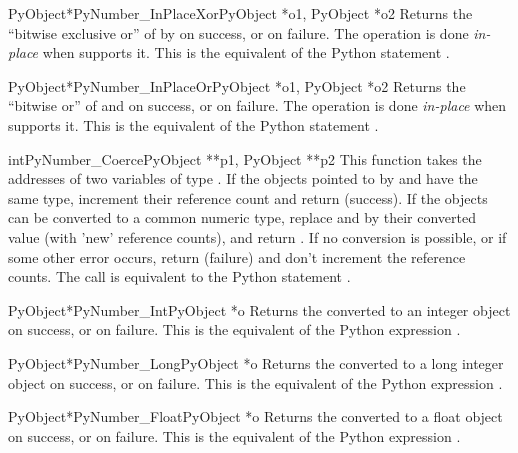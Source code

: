 \begin{cfuncdesc}{PyObject*}{PyNumber_InPlaceXor}{PyObject *o1, PyObject *o2}
  Returns the ``bitwise exclusive or'' of  by  on
  success, or \NULL{} on failure.  The operation is done
  \emph{in-place} when  supports it.  This is the equivalent
  of the Python statement .
\end{cfuncdesc}

\begin{cfuncdesc}{PyObject*}{PyNumber_InPlaceOr}{PyObject *o1, PyObject *o2}
  Returns the ``bitwise or'' of  and  on success, or
  \NULL{} on failure.  The operation is done \emph{in-place} when
   supports it.  This is the equivalent of the Python
  statement .
\end{cfuncdesc}

\begin{cfuncdesc}{int}{PyNumber_Coerce}{PyObject **p1, PyObject **p2}
  This function takes the addresses of two variables of type
  .  If the objects pointed to by 
  and  have the same type, increment their reference
  count and return  (success). If the objects can be converted
  to a common numeric type, replace  and  by their
  converted value (with 'new' reference counts), and return .
  If no conversion is possible, or if some other error occurs, return
   (failure) and don't increment the reference counts.  The
  call  is equivalent to the Python
  statement .
\end{cfuncdesc}

\begin{cfuncdesc}{PyObject*}{PyNumber_Int}{PyObject *o}
  Returns the  converted to an integer object on success, or
  \NULL{} on failure.  This is the equivalent of the Python expression
  .
\end{cfuncdesc}

\begin{cfuncdesc}{PyObject*}{PyNumber_Long}{PyObject *o}
  Returns the  converted to a long integer object on success,
  or \NULL{} on failure.  This is the equivalent of the Python
  expression .
\end{cfuncdesc}

\begin{cfuncdesc}{PyObject*}{PyNumber_Float}{PyObject *o}
  Returns the  converted to a float object on success, or
  \NULL{} on failure.  This is the equivalent of the Python expression
  .
\end{cfuncdesc}


